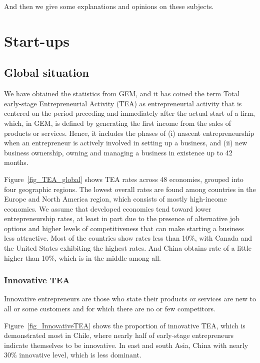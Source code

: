 \documentclass[10pt]{article}
\begin{document}
And then we give some explanations and opinions on these subjects.

\section{Start-ups}

\subsection{Global situation}


We have obtained the statistics from GEM, and it has coined the term Total early-stage Entrepreneurial Activity (TEA) as entrepreneurial activity that is centered on the period preceding and immediately after the actual start of a firm, which, in GEM, is defined by generating the first income from the sales of products or services. Hence, it includes the phases of (i) nascent entrepreneurship when an entrepreneur is actively involved in setting up a business, and (ii) new business ownership, owning and managing a business in existence up to 42 months.

Figure~\ref{fig_TEA_global} shows TEA rates across 48 economies, grouped into four geographic regions. The lowest overall rates are found among countries in the Europe and North America region, which consists of mostly high-income economies. We assume that developed economies tend toward lower entrepreneurship rates, at least in part due to the presence of alternative job options and
higher levels of competitiveness that can make starting a business less attractive. Most of the countries show rates less than 10\%, with Canada and the United States exhibiting the highest rates. And China obtains rate of a little higher than 10\%, which is in the middle among all.

\subsubsection{Innovative TEA}

Innovative entrepreneurs are those who state their products or services are new to all or some customers and for which there are no or few competitors.

Figure~\ref{fig_InnovativeTEA} shows the proportion of innovative TEA, which is demonstrated most in Chile, where nearly half of early-stage entrepreneurs indicate themselves to be innovative. In east and south Asia, China with nearly 30\% innovative level, which is less dominant.
\end{document}
